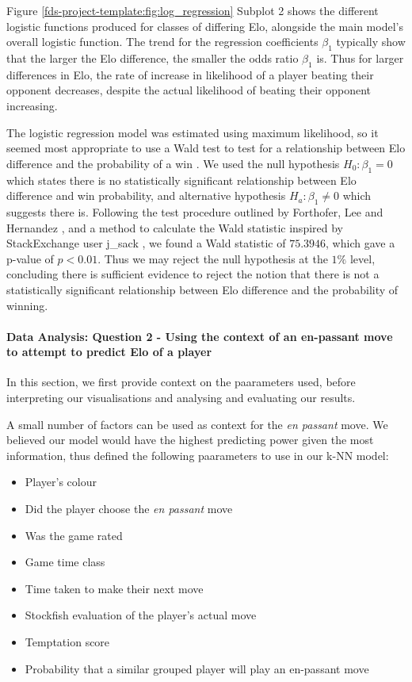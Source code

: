 \documentclass[10pt,a4paper]{article}
\begin{document}
\begin{multicols}{2}
Figure \ref{fds-project-template:fig:log_regression} Subplot 2 shows the different logistic functions produced for classes of differing Elo, alongside the main model's overall logistic function. The trend for the regression coefficients $\beta_{1}$ typically show that the larger the Elo difference, the smaller the odds ratio $\beta_{1}$ is. Thus for larger differences in Elo, the rate of increase in likelihood of a player beating their opponent decreases, despite the actual likelihood of beating their opponent increasing. \newline

The logistic regression model was estimated using maximum likelihood, so it seemed most appropriate to use a Wald test to test for a relationship between Elo difference and the probability of a win \cite{WaldTest}. We used the null hypothesis $H_{0}: \beta_{1} = 0$ which states there is no statistically significant relationship between Elo difference and win probability, and alternative hypothesis $H_{a}: \beta_{1} \neq 0$ which suggests there is. Following the test procedure outlined by Forthofer, Lee and Hernandez \cite{WaldTest}, and a method to calculate the Wald statistic inspired by StackExchange user j\_sack \cite{StackExchangeWaldTest}, we found a Wald statistic of $75.3946$, which gave a p-value of $p<0.01$. Thus we may reject the null hypothesis at the $1\%$ level, concluding there is sufficient evidence to reject the notion that there is not a statistically significant relationship between Elo difference and the probability of winning. \newline

\paragraph{Data Analysis: Question 2 - Using the context of an en-passant move to attempt to predict Elo of a player}

In this section, we first provide context on the paarameters used, before interpreting our visualisations and analysing and evaluating our results. \newline

A small number of factors can be used as context for the \textit{en passant} move. We believed our model would have the highest predicting power given the most information, thus defined the following paarameters to use in our k-NN model:

\begin{itemize}
\addtolength\itemsep{-2.5mm}
  \item Player's colour
  \item Did the player choose the \textit{en passant} move
  \item Was the game rated
  \item Game time class
  \item Time taken to make their next move
  \item Stockfish evaluation of the player's actual move
  \item Temptation score
  \item Probability that a similar grouped player will play an en-passant move
\end{itemize}


\end{multicols}
\end{document}
